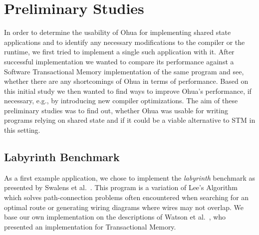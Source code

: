 %
\chapter{Preliminary Studies}
\label{sec:preliminary}

In order to determine the usability of Ohua for implementing shared state applications and to identify any necessary modifications to the compiler or the runtime, we first tried to implement a single such application with it.
After successful implementation we wanted to compare its performance against a Software Transactional Memory implementation of the same program and see, whether there are any shortcomings of Ohua in terms of performance.
Based on this initial study we then wanted to find ways to improve Ohua's performance, if necessary, e.g., by introducing new compiler optimizations.
The aim of these preliminary studies was to find out, whether Ohua was usable for writing programs relying on shared state and if it could be a viable alternative to STM in this setting.

\section{Labyrinth Benchmark}
\label{sec:preliminary:labyrinth}

As a first example application, we chose to implement the \emph{labyrinth} benchmark as presented by Swalens et al.~\cite{swalens2016transactional}.
This program is a variation of Lee's Algorithm~\cite{lee1961algorithm} which solves path-connection problems often encountered when searching for an optimal route or generating wiring diagrams where wires may not overlap.
We base our own implementation on the descriptions of Watson et al.~\cite{watson2007study}, who presented an implementation for Transactional Memory.

